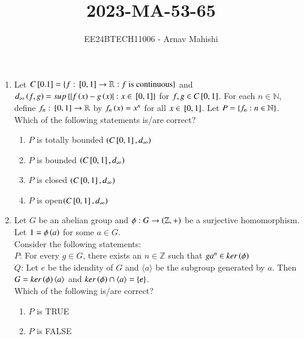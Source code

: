 \documentclass[journal]{IEEEtran}
\begin{document}

\vspace{3cm}

\title{2023-MA-53-65}
\author{EE24BTECH11006 - Arnav Mahishi}
{\let\newpage\relax\maketitle}
\begin{enumerate}
\item{
Let $C{}\left[0.1\right]=\left\{f:{}\left[0,1\right]\rightarrow\mathbb{R}:f\text{ is continuous}\right\}$ and $d_{\infty}\left(f,g\right)=sup\left\{\left\vert f\left(x\right)-g\left(x\right)\right\vert:x\in{}\left[0,1\right]\right\}$ for $f,g\in C{}\left[0,1\right]$. For each $n\in\mathbb{N}$, define $f_n:{}\left[0,1\right]\rightarrow\mathbb{R}$ by $f_n\left(x\right)=x^n$ for all $x\in{}\left[0,1\right]$. Let $P=\left\{f_n:n\in\mathbb{N}\right\}$. Which of the following statements is/are correct? 
\begin{multicols}{2}
\begin{enumerate}
\item $P$ is totally bounded $\left(C{}\left[0,1\right],d_\infty\right)$
\item $P$ is bounded $\left(C{}\left[0,1\right],d_\infty\right)$
\item $P$ is closed $\left(C{}\left[0,1\right],d_\infty\right)$
\item $P$ is open$\left(C{}\left[0,1\right],d_\infty\right)$
\end{enumerate}
\end{multicols}
}
\item{
Let $G$ be an abelian group and $\phi:G\rightarrow\left(\mathbb{Z},+\right)$ be a surjective homomorphism. Let $1=\phi\left(a\right)$ for some $a\in G$.\\
Consider the following statements:\\
$P$: For every $g\in G$, there exists an $n\in\mathbb{Z}$ such that $ga^n\in ker\left(\phi\right)$\\
$Q$: Let $e$ be the idendity of $G$ and $\langle a\rangle$ be the subgroup generated by $a$. Then $G=ker\left(\phi\right)\langle a\rangle$ and $ker\left(\phi\right)\cap\langle a\rangle=\left\{e\right\}$.\\
Which of the following is/are correct?
\begin{multicols}{4}
\begin{enumerate}
\item $P$ is TRUE
\item $P$ is FALSE 

\end{enumerate}
\end{multicols}}
\end{enumerate}
\end{document}
